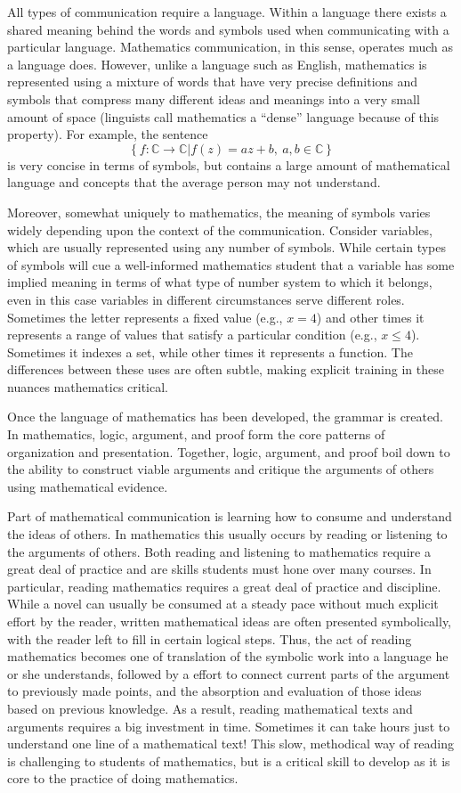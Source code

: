 \documentclass[
]{book}
\theoremstyle{definition}
\theoremstyle{definition}
\theoremstyle{definition}
\theoremstyle{definition}
\theoremstyle{remark}
\begin{document}
All types of communication require a language. Within a language there exists a shared meaning behind the words and symbols used when communicating with a particular language. Mathematics communication, in this sense, operates much as a language does. However, unlike a language such as English, mathematics is represented using a mixture of words that have very precise definitions and symbols that compress many different ideas and meanings into a very small amount of space (linguists call mathematics a ``dense'' language because of this property). For example, the sentence \[\left\{ f: \mathbb{C}\rightarrow \mathbb{C} \vert f(z)=az+b, \: a,b\in \mathbb{C}\right\}\] is very concise in terms of symbols, but contains a large amount of mathematical language and concepts that the average person may not understand.

Moreover, somewhat uniquely to mathematics, the meaning of symbols varies widely depending upon the context of the communication. Consider variables, which are usually represented using any number of symbols. While certain types of symbols will cue a well-informed mathematics student that a variable has some implied meaning in terms of what type of number system to which it belongs, even in this case variables in different circumstances serve different roles. Sometimes the letter represents a fixed value (e.g., \(x=4\)) and other times it represents a range of values that satisfy a particular condition (e.g., \(x\leq 4\)). Sometimes it indexes a set, while other times it represents a function. The differences between these uses are often subtle, making explicit training in these nuances mathematics critical.

Once the language of mathematics has been developed, the grammar is created. In mathematics, logic, argument, and proof form the core patterns of organization and presentation. Together, logic, argument, and proof boil down to the ability to construct viable arguments and critique the arguments of others using mathematical evidence.

Part of mathematical communication is learning how to consume and understand the ideas of others. In mathematics this usually occurs by reading or listening to the arguments of others. Both reading and listening to mathematics require a great deal of practice and are skills students must hone over many courses. In particular, reading mathematics requires a great deal of practice and discipline. While a novel can usually be consumed at a steady pace without much explicit effort by the reader, written mathematical ideas are often presented symbolically, with the reader left to fill in certain logical steps. Thus, the act of reading mathematics becomes one of translation of the symbolic work into a language he or she understands, followed by a effort to connect current parts of the argument to previously made points, and the absorption and evaluation of those ideas based on previous knowledge. As a result, reading mathematical texts and arguments requires a big investment in time. Sometimes it can take hours just to understand one line of a mathematical text! This slow, methodical way of reading is challenging to students of mathematics, but is a critical skill to develop as it is core to the practice of doing mathematics.
\end{document}
